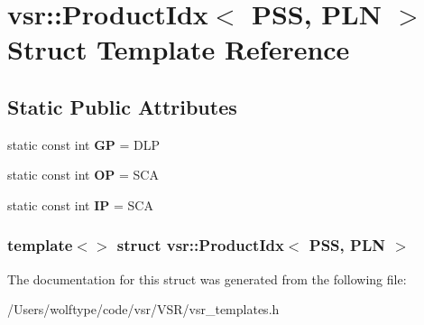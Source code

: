 \hypertarget{structvsr_1_1_product_idx_3_01_p_s_s_00_01_p_l_n_01_4}{\section{vsr\-:\-:Product\-Idx$<$ P\-S\-S, P\-L\-N $>$ Struct Template Reference}
\label{structvsr_1_1_product_idx_3_01_p_s_s_00_01_p_l_n_01_4}
}
\subsection*{Static Public Attributes}
\begin{DoxyCompactItemize}
\item 
\hypertarget{structvsr_1_1_product_idx_3_01_p_s_s_00_01_p_l_n_01_4_a9f91ed991e28dc976ef8f8a9d1804016}{static const int {\bfseries G\-P} = D\-L\-P}\label{structvsr_1_1_product_idx_3_01_p_s_s_00_01_p_l_n_01_4_a9f91ed991e28dc976ef8f8a9d1804016}

\item 
\hypertarget{structvsr_1_1_product_idx_3_01_p_s_s_00_01_p_l_n_01_4_a8e4ea949e24006aea820ef2d3de3f8fb}{static const int {\bfseries O\-P} = S\-C\-A}\label{structvsr_1_1_product_idx_3_01_p_s_s_00_01_p_l_n_01_4_a8e4ea949e24006aea820ef2d3de3f8fb}

\item 
\hypertarget{structvsr_1_1_product_idx_3_01_p_s_s_00_01_p_l_n_01_4_a4c84ee6e890d3d9754fde1c77b3fc4ac}{static const int {\bfseries I\-P} = S\-C\-A}\label{structvsr_1_1_product_idx_3_01_p_s_s_00_01_p_l_n_01_4_a4c84ee6e890d3d9754fde1c77b3fc4ac}

\end{DoxyCompactItemize}
\subsubsection*{template$<$$>$ struct vsr\-::\-Product\-Idx$<$ P\-S\-S, P\-L\-N $>$}



The documentation for this struct was generated from the following file\-:\begin{DoxyCompactItemize}
\item 
/\-Users/wolftype/code/vsr/\-V\-S\-R/vsr\-\_\-templates.\-h\end{DoxyCompactItemize}

